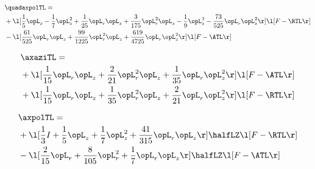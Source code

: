 \begin{alignat}{2} 
\label{eq:quadaxpolTL_2} 
& \quadaxpolTL = \\ 
& + \l[ \frac{1}{5} \opL_z - \frac{1}{7} \opL_z^{2} + \frac{1}{25} \opL_r \opL_z + \frac{3}{175} \opL_r^{2} \opL_z - \frac{1}{9} \opL_z^{3} - \frac{73}{525} \opL_r \opL_z^{2}  \r] \l[ F - \RTL \r] \nonumber \\ 
& - \l[ \frac{61}{525} \opL_r \opL_z + \frac{99}{1225} \opL_r^{2} \opL_z + \frac{619}{4725} \opL_r \opL_z^{2}  \r] \l[ F - \ATL \r] \nonumber \\ 
\end{alignat} 


\begin{alignat}{2} 
\label{eq:linaxaziTL_2} 
& \axaziTL = \\ 
& + \l[ \frac{1}{15} \opL_r \opL_z + \frac{2}{21} \opL_r^{2} \opL_z + \frac{1}{35} \opL_r \opL_z^{2}  \r] \l[ F - \ATL \r] \nonumber \\ 
& + \l[ \frac{1}{15} \opL_r \opL_z + \frac{1}{35} \opL_r^{2} \opL_z + \frac{2}{21} \opL_r \opL_z^{2}  \r] \l[ F - \RTL \r] \nonumber \\ 
\end{alignat} 


\begin{alignat}{2} 
\label{eq:linaxpolTL_2} 
& \axpolTL = \\ 
& + \l[ \frac{1}{3} I + \frac{1}{5} \opL_z + \frac{1}{7} \opL_z^{2} + \frac{41}{315} \opL_r \opL_z  \r] \halfLZ \l[ F - \RTL \r] \nonumber \\ 
& - \l[ \frac{2}{15} \opL_r + \frac{8}{105} \opL_r^{2} + \frac{1}{7} \opL_r \opL_z  \r] \halfLZ \l[ F - \ATL \r] \nonumber \\ 
\end{alignat} 


